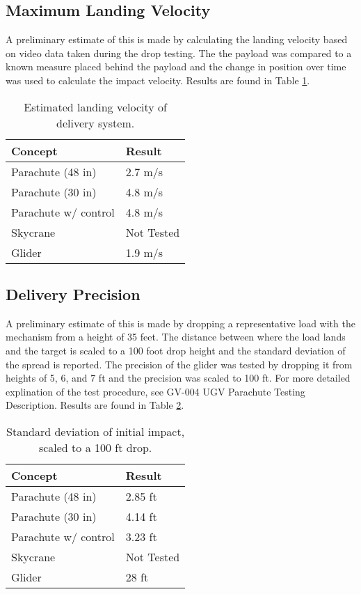 \documentclass[]{auvsi_doc}
\begin{document}
	\subsection{Maximum Landing Velocity}

	
	A preliminary estimate of this is made by calculating the landing velocity based on video data taken during the drop testing. The the payload was compared to a known measure placed behind the payload and the change in position over time was used to calculate the impact velocity. Results are found in Table \ref{vel}.


	\begin{table}[!h]
	\centering

	\caption{Estimated landing velocity of delivery system.}
	\label{vel}
	\begin{tabular}{|l|l|}
		\hline
		\textbf{Concept}       & \textbf{Result} \\
		\hline
		Parachute (48 in)              &        2.7 m/s         \\
		Parachute (30 in)		&	4.8 m/s\\
		Parachute w/ control   &                4.8 m/s \\
		Skycrane               &                 Not Tested\\
		Glider                 &			1.9 m/s	 \\
		\hline
	\end{tabular}
	\end{table}

	\subsection{Delivery Precision}

	A preliminary estimate of this is made by dropping a representative load with the mechanism from a height of 35 feet. The distance between where the load lands and the target is scaled to a 100 foot drop height and the standard deviation of the spread is reported. The precision of the glider was tested by dropping it from heights of 5, 6, and 7 ft and the precision was scaled to 100 ft. For more detailed explination of the test procedure, see GV-004 UGV Parachute Testing Description. Results are found in Table \ref{precision}.

	\begin{table}[!h]
	\centering

	\caption{Standard deviation of initial impact, scaled to a 100 ft drop.}
	\label{precision}
	\begin{tabular}{|l|l|}
		\hline
		\textbf{Concept}       & \textbf{Result} \\
		\hline
		Parachute (48 in)              &        2.85 ft        \\
		Parachute (30 in)		& 4.14 ft	\\
		Parachute w/ control   &      3.23 ft           \\
		Skycrane               &            Not Tested    \\
		Glider                 &		28 ft		 \\
		\hline
	\end{tabular}
	\end{table}
\end{document}
